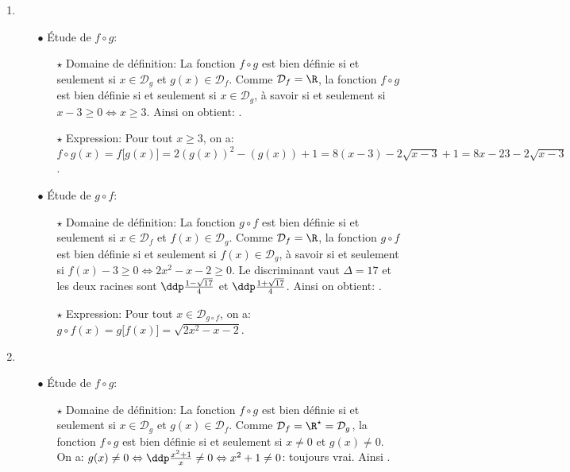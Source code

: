 \begin{correction}  \;
\begin{enumerate}
\item
\begin{itemize}
\item[$\bullet$] \'Etude de $f\circ g$:
\begin{itemize}
\item[$\star$] Domaine de d\'efinition: La fonction $f\circ g$ est bien d\'efinie si et seulement si $x\in\mathcal{D}_g$ et $g(x)\in\mathcal{D}_f$. Comme $\mathcal{D}_f=\R$, la fonction $f\circ g$ est bien d\'efinie si et seulement si $x\in\mathcal{D}_g$, \`{a} savoir si et seulement si $x-3\geq 0\Leftrightarrow x\geq 3$. Ainsi on obtient: . 
\item[$\star$] Expression: Pour tout $x\geq 3$, on a: $f\circ g(x)=f\lbrack g(x)\rbrack= 2(g(x))^2-(g(x))+1=8(x-3)-2\sqrt{x-3}+1=8x-23-2\sqrt{x-3}$.
\end{itemize}
\item[$\bullet$] \'Etude de $g\circ f$:
\begin{itemize}
\item[$\star$] Domaine de d\'efinition: La fonction $g\circ f$ est bien d\'efinie si et seulement si $x\in\mathcal{D}_f$ et $f(x)\in\mathcal{D}_g$. Comme $\mathcal{D}_f=\R$, la fonction $g\circ f$ est bien d\'efinie si et seulement si $f(x)\in\mathcal{D}_g$, \`{a} savoir si et seulement si $f(x)-3\geq 0\Leftrightarrow 2x^2-x-2\geq 0$. Le discriminant vaut $\Delta=17$ et les deux racines sont $\ddp\frac{1-\sqrt{17}}{4}$ et $\ddp\frac{1+\sqrt{17}}{4}$. Ainsi on obtient: .
\item[$\star$] Expression: Pour tout $x\in\mathcal{D}_{g\circ f}$, on a: $g\circ f(x)=g\lbrack f(x)\rbrack=\sqrt{2x^2-x-2}$.
\end{itemize}
\end{itemize}
\item
\begin{itemize}
\item[$\bullet$] \'Etude de $f\circ g$:
\begin{itemize}
\item[$\star$] Domaine de d\'efinition: La fonction $f\circ g$ est bien d\'efinie si et seulement si $x\in\mathcal{D}_g$ et $g(x)\in\mathcal{D}_f$. Comme $\mathcal{D}_f=\R^{\star}=\mathcal{D}_g$, la fonction $f\circ g$ est bien d\'efinie si et seulement si $x\not= 0$ et $g(x)\not= 0$. On a: $g(x)\not= 0\Leftrightarrow \ddp\frac{x^2+1}{x}\not= 0\Leftrightarrow x^2+1\not= 0$: toujours vrai. Ainsi .

\end{itemize}
\end{itemize}
\end{enumerate}
\end{correction}
